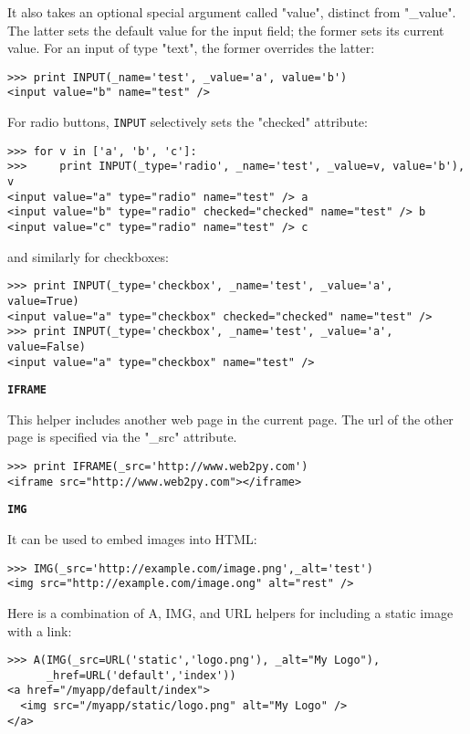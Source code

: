 \documentclass[justified,sixbynine,notoc]{tufte-book}
\def\ft{\small\tt}
\def\inxx#1{\index{#1}}
\begin{document}
\begin{fullwidth}
It also takes an optional special argument called "value", distinct from "\_value". The latter sets the default value for the input field; the former sets its current value. For an input of type "text", the former overrides the latter:
\begin{lstlisting}
>>> print INPUT(_name='test', _value='a', value='b')
<input value="b" name="test" />
\end{lstlisting}

For radio buttons, {\ft INPUT} selectively sets the "checked" attribute:

\inxx{radio}
\begin{lstlisting}
>>> for v in ['a', 'b', 'c']:
>>>     print INPUT(_type='radio', _name='test', _value=v, value='b'), v
<input value="a" type="radio" name="test" /> a
<input value="b" type="radio" checked="checked" name="test" /> b
<input value="c" type="radio" name="test" /> c
\end{lstlisting}
\noindent and similarly for checkboxes:

\inxx{checkbox}
\begin{lstlisting}
>>> print INPUT(_type='checkbox', _name='test', _value='a', value=True)
<input value="a" type="checkbox" checked="checked" name="test" />
>>> print INPUT(_type='checkbox', _name='test', _value='a', value=False)
<input value="a" type="checkbox" name="test" />
\end{lstlisting}

{\bf {\ft IFRAME}}

This helper includes another web page in the current page. The url of the other page is specified via the "\_src" attribute.

\inxx{IFRAME}
\begin{lstlisting}
>>> print IFRAME(_src='http://www.web2py.com')
<iframe src="http://www.web2py.com"></iframe>
\end{lstlisting}

{\bf {\ft IMG}}

\inxx{IMG}

It can be used to embed images into HTML:

\begin{lstlisting}
>>> IMG(_src='http://example.com/image.png',_alt='test')
<img src="http://example.com/image.ong" alt="rest" />
\end{lstlisting}

Here is a combination of A, IMG, and URL helpers for including a static image with a link:

\begin{lstlisting}
>>> A(IMG(_src=URL('static','logo.png'), _alt="My Logo"),
      _href=URL('default','index'))
<a href="/myapp/default/index">
  <img src="/myapp/static/logo.png" alt="My Logo" />
</a>
\end{lstlisting}


\end{fullwidth}
\end{document}
